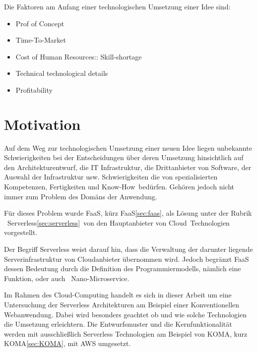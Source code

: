 \documentclass[
12pt,
english,
ngerman,
headsepline,
twoside,
openright,
numbers=noenddot,version=first
]{scrreprt}
\begin{document}

Die Faktoren am Anfang einer technologischen Umsetzung einer Idee sind:
\begin{itemize}
\item Prof of Concept\label{aspect:proofConcept}
\item Time-To-Market\label{aspect:timeToMarket}
\item Cost of Human Resources:: Skill-shortage\label{aspect:CostHumanResources}
\item Technical technological details\label{aspect:techDetails}
\item Profitability\label{aspect:profit}
\end{itemize}


\section{Motivation}
Auf dem Weg zur technologischen Umsetzung einer neuen Idee liegen unbekannte Schwierigkeiten
bei der Entscheidungen über deren Umsetzung hinsichtlich auf den Architekturentwurf, die IT Infrastruktur, die Drittanbieter von Software, der Auswahl der Infrastruktur usw.
Schwierigkeiten die von spezialisierten Kompetenzen, Fertigkeiten und \glqq Know-How\grqq\ bedürfen.
Gehören jedoch nicht immer zum Problem des Domäns der Anwendung.

Für dieses Problem wurde \acrlong{FaaS}, kürz \acrshort{FaaS}\ref{sec:faas}, als Lösung unter der Rubrik \glqq\ Serverless\ref{sec:serverless}\grqq\ von den Hauptanbieter von \glqq Cloud\grqq\ Technologien vorgestellt.

Der Begriff Serverless weist darauf hin, dass die Verwaltung der darunter liegende Serverinfrastruktur von Cloudanbieter übernommen wird. Jedoch begränzt \acrshort{FaaS} dessen Bedeutung durch die Definition des Programmiermodells, nämlich eine Funktion, oder auch \glqq\ Nano-Microservice\grqq.

Im Rahmen des Cloud-Computing handelt es sich in dieser Arbeit um eine Untersuchung der Serverless Architekturen am Beispiel einer Konventionellen Webanwendung. Dabei wird besonders geachtet ob und wie solche Technologien die Umsetzung erleichtern. Die Entwurfsmuster und die Kernfunktionalität werden mit ausschließlich Serverless Technologien am Beispiel von \acrfull{KOMA}, kurz \acrshort{KOMA}\ref{sec:KOMA}, mit AWS umgesetzt.
\end{document}
